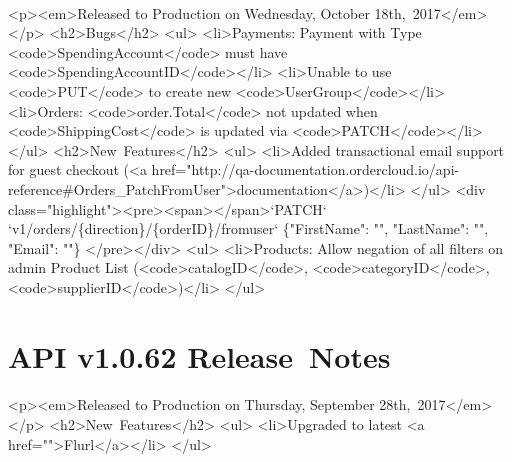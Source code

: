 \documentclass{memoir}%
\begin{document}
\paragraph*{}%
<p><em>Released to Production on Wednesday, October 18th,~2017</em></p>\newline%
<h2>Bugs</h2>\newline%
<ul>\newline%
<li>Payments: Payment with Type <code>SpendingAccount</code> must have <code>SpendingAccountID</code></li>\newline%
<li>Unable to use <code>PUT</code> to create new <code>UserGroup</code></li>\newline%
<li>Orders: <code>order.Total</code> not updated when <code>ShippingCost</code> is updated via <code>PATCH</code></li>\newline%
</ul>\newline%
<h2>New~Features</h2>\newline%
<ul>\newline%
<li>Added transactional email support for guest checkout (<a href="http://qa{-}documentation.ordercloud.io/api{-}reference\#Orders\_PatchFromUser">documentation</a>)</li>\newline%
</ul>\newline%
<div class="highlight"><pre><span></span>`PATCH` `v1/orders/\{direction\}/\{orderID\}/fromuser`\newline%
\{"FirstName": "", "LastName": "", "Email": ""\}\newline%
</pre></div>\newline%
<ul>\newline%
<li>Products: Allow negation of all filters on admin Product List (<code>catalogID</code>, <code>categoryID</code>, <code>supplierID</code>)</li>\newline%
</ul>

%
\section*{API v1.0.62 Release~Notes}%
\paragraph*{}%

%
\paragraph*{}%
<p><em>Released to Production on Thursday, September 28th,~2017</em></p>\newline%
<h2>New~Features</h2>\newline%
<ul>\newline%
<li>Upgraded to latest <a href="">Flurl</a></li>\newline%
</ul>
\end{document}

